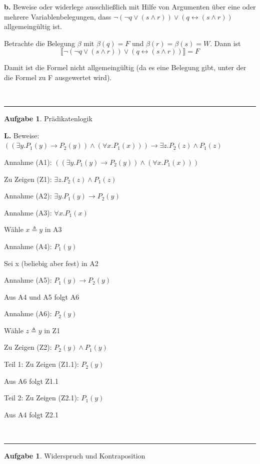 \documentclass[10pt,leqno ]{article}
\theoremstyle{definition}
\newtheorem{problem}[theorem]{Aufgabe}
\newenvironment{solution}[1][L]{\begin{doublespace}\textbf{#1.}\quad }{\ \rule{0.5em}{0.5em}\end{doublespace}}
\begin{document}
\begin{solution}[b]
Beweise oder widerlege ausschließlich mit Hilfe von Argumenten über eine oder mehrere Variablenbelegungen, dass \( \lnot (\lnot q \lor (s \land r)) \lor (q \leftrightarrow (s \land r)) \) allgemeingültig ist.

Betrachte die Belegung \( \beta \) mit \( \beta (q) = F \) und \( \beta (r) = \beta (s) = W \). Dann ist
\[ \llbracket \lnot (\lnot q \lor (s \land r)) \lor (q \leftrightarrow (s \land r)) \rrbracket = F \]

Damit ist die Formel nicht allgemeingültig (da es eine Belegung gibt, unter der die Formel zu F ausgewertet wird).

\end{solution}
    
\begin{problem}
    Prädikatenlogik
\end{problem}

\begin{solution}
Beweise: \( ((\exists y . P_1(y) \rightarrow P_2(y)) \land (\forall x . P_1(x))) \rightarrow \exists z . P_2(z) \land P_1(z) \)

Annahme (A1): \( ((\exists y . P_1(y) \rightarrow P_2(y)) \land (\forall x . P_1(x))) \)

Zu Zeigen (Z1): \( \exists z . P_2(z) \land P_1(z) \)

Annahme (A2): \( \exists y . P_1(y) \rightarrow P_2(y) \)

Annahme (A3): \( \forall x . P_1(x) \)

Wähle \(  x \triangleq y \) in A3

Annahme (A4): \( P_1(y) \)

Sei x (beliebig aber fest) in A2

Annahme (A5): \( P_1(y) \rightarrow P_2(y) \)

Aus A4 und A5 folgt A6

Annahme (A6): \( P_2(y) \)

Wähle \( z \triangleq y \) in Z1

Zu Zeigen (Z2): \( P_2(y) \land P_1(y) \)

Teil 1: Zu Zeigen (Z1.1): \( P_2(y) \)

\qquad Aus A6 folgt Z1.1

Teil 2: Zu Zeigen (Z2.1): \( P_1(y) \)

\qquad Aus A4 folgt Z2.1

\end{solution}

\begin{problem}
    Widerspruch und Kontraposition
\end{problem}
\end{document}
